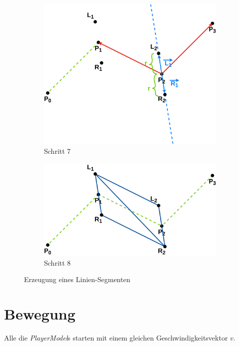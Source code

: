 \documentclass[doktyp=studarbeit]{TUBAFarbeiten}
\begin{document}
\begin{figure}[!htb]
\begin{subfigure}[b]{0.45\textwidth}
        \includegraphics[width=1\linewidth]{Schlangenlinie-7.png}
        \caption{Schritt 7}
    \end{subfigure}
    \qquad
    \begin{subfigure}[b]{0.45\textwidth}
        \centering
        \includegraphics[width=1\linewidth]{Schlangenlinie-8.png}
        \caption{Schritt 8}
    \end{subfigure}
    \caption{Erzeugung eines Linien-Segmenten}
	\label{fig:line}
\end{figure}

\section{Bewegung}

Alle die \textit{PlayerModel}s starten mit einem gleichen 
Geschwindigkeitsvektor $v$.
\end{document}
